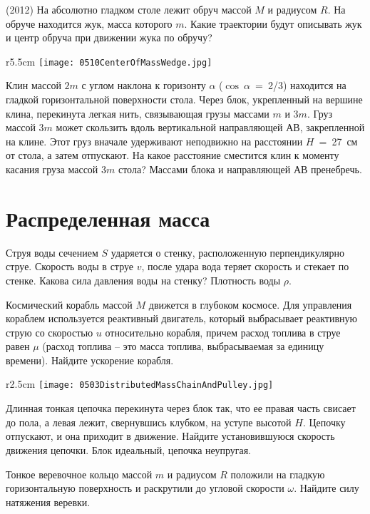 \AddProb (2012) На абсолютно гладком столе лежит обруч массой $M$ и радиусом $R$. На обруче находится жук, масса которого $m$. 
Какие траектории будут описывать жук и центр обруча при движении жука по обручу?

\begin{wrapfigure}{r}{5.5cm}
\texttt{[image: 0510CenterOfMassWedge.jpg]}
\end{wrapfigure}

\AddProb Клин массой $2m$ с углом наклона к горизонту $\alpha $ ($\cos~\alpha$~=~2/3) находится на гладкой горизонтальной поверхности стола. 
Через блок, укрепленный на вершине клина, перекинута легкая нить, связывающая грузы массами $m$ и $3m$. 
Груз массой $3m$ может скользить вдоль вертикальной направляющей АВ, закрепленной на клине. 
Этот груз вначале удерживают неподвижно на расстоянии $H$~=~27~см от стола, а затем отпускают. 
На какое расстояние сместится клин к моменту касания груза массой $3m$ стола? Массами блока и направляющей АВ пренебречь.


\section{Распределенная масса}

\AddProb Струя воды сечением $S$ ударяется о стенку, расположенную перпендикулярно струе. 
Скорость воды в струе $v$, после удара вода теряет скорость и стекает по стенке. Какова сила давления воды на стенку? Плотность воды $\rho$.

\AddProb Космический корабль массой $M$ движется в глубоком космосе. Для управления кораблем используется реактивный двигатель, 
который выбрасывает реактивную струю со скоростью $u$ относительно корабля, причем расход топлива в струе равен $\mu$ 
(расход топлива -- это масса топлива, выбрасываемая за единицу времени). Найдите ускорение корабля.

\begin{wrapfigure}{r}{2.5cm}
\texttt{[image: 0503DistributedMassChainAndPulley.jpg]}
\end{wrapfigure}

\AddProb Длинная тонкая цепочка перекинута через блок так, что ее правая часть свисает до пола, а левая лежит, 
свернувшись клубком, на уступе высотой $H$. Цепочку отпускают, и она приходит в движение. 
Найдите установившуюся скорость движения цепочки. Блок идеальный, цепочка неупругая.

\AddProb Тонкое веревочное кольцо массой $m$ и радиусом $R$ положили на гладкую горизонтальную поверхность и 
раскрутили до угловой скорости $\omega$. Найдите силу натяжения веревки.

